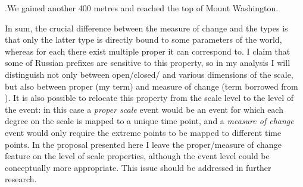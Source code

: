 \ex.\label{ex:elevation:top}We gained another 400 metres and reached the top of Mount Washington.

In sum, the crucial difference between the measure of change and the  types is that only the latter type is directly bound to some parameters of the world, whereas for each  there exist multiple proper  it can correspond to. I claim that some of Russian prefixes are sensitive to this property, so in my analysis I will distinguish not only between open\slash closed\slash {} and various dimensions of the scale, but also between proper  (my term) and measure of change  (term borrowed from \citealt{KennedyLevin:08}). It is also possible to relocate this property from the scale level to the level of the event: in this case a \textit{proper scale} event would be an event for which each degree on the scale is mapped to a unique time point, and a \textit{measure of change} event would only require the extreme points to be mapped to different time points. In the proposal presented here I leave the proper/measure of change feature on the level of scale properties, although the event level could be conceptually more appropriate. This issue should be addressed in further research.


